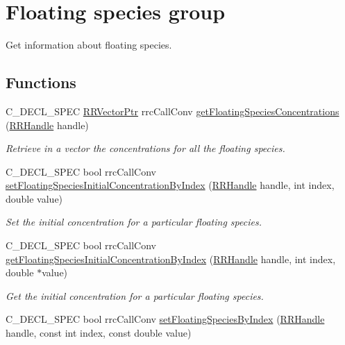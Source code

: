 \hypertarget{group__floating}{\section{Floating species group}
\label{group__floating}
}


Get information about floating species.  


\subsection*{Functions}
\begin{DoxyCompactItemize}
\item 
C\-\_\-\-D\-E\-C\-L\-\_\-\-S\-P\-E\-C \hyperlink{rrc__types_8h_a3be72d6006034fd349f753d2bf441bf7}{R\-R\-Vector\-Ptr} rrc\-Call\-Conv \hyperlink{group__floating_ga0659eab040dbdfde46b9fc73b46b65d6}{get\-Floating\-Species\-Concentrations} (\hyperlink{rrc__types_8h_a1d68f0592372208fa5a5f2799ea4b3ae}{R\-R\-Handle} handle)
\begin{DoxyCompactList}\small\item\em Retrieve in a vector the concentrations for all the floating species. \end{DoxyCompactList}\item 
C\-\_\-\-D\-E\-C\-L\-\_\-\-S\-P\-E\-C bool rrc\-Call\-Conv \hyperlink{group__floating_ga1a86710f9772e7a7072aa7de264b0c45}{set\-Floating\-Species\-Initial\-Concentration\-By\-Index} (\hyperlink{rrc__types_8h_a1d68f0592372208fa5a5f2799ea4b3ae}{R\-R\-Handle} handle, int index, double value)
\begin{DoxyCompactList}\small\item\em Set the initial concentration for a particular floating species. \end{DoxyCompactList}\item 
C\-\_\-\-D\-E\-C\-L\-\_\-\-S\-P\-E\-C bool rrc\-Call\-Conv \hyperlink{group__floating_ga7dcf8267460ec9fec7559194ed7e7e1d}{get\-Floating\-Species\-Initial\-Concentration\-By\-Index} (\hyperlink{rrc__types_8h_a1d68f0592372208fa5a5f2799ea4b3ae}{R\-R\-Handle} handle, int index, double $\ast$value)
\begin{DoxyCompactList}\small\item\em Get the initial concentration for a particular floating species. \end{DoxyCompactList}\item 
C\-\_\-\-D\-E\-C\-L\-\_\-\-S\-P\-E\-C bool rrc\-Call\-Conv \hyperlink{group__floating_ga892e70470a45d8be4e443c6048064c0e}{set\-Floating\-Species\-By\-Index} (\hyperlink{rrc__types_8h_a1d68f0592372208fa5a5f2799ea4b3ae}{R\-R\-Handle} handle, const int index, const double value)

\end{DoxyCompactItemize}
